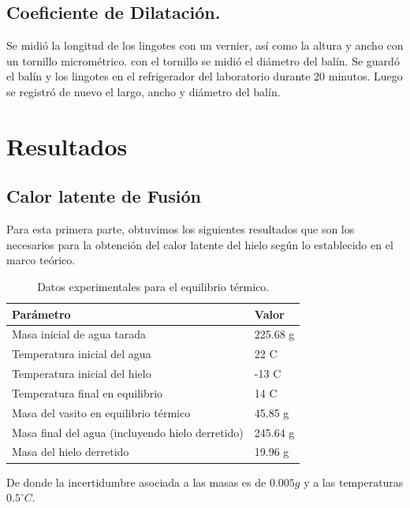 \documentclass{article}
\begin{document}
    \subsection{Coeficiente de Dilatación.}
        Se midió la longitud de los lingotes con un vernier, así como la altura y ancho con un tornillo micrométrico. con el tornillo se midió el diámetro del balín. Se guardó el balín y los lingotes en el refrigerador del laboratorio durante 20 minutos. Luego se registró de nuevo el largo, ancho y diámetro del balín.

\section{Resultados}
\subsection{Calor latente de Fusión}
Para esta primera parte, obtuvimos los siguientes resultados que son los necesarios para la obtención del calor latente del hielo según lo establecido en el marco teórico.

\begin{table}[h!]
\centering
\begin{tabular}{@{}ll@{}}
\toprule
\textbf{Parámetro}                             & \textbf{Valor}          \\ \midrule
Masa inicial de agua tarada                   & 225.68 g                \\
Temperatura inicial del agua                  & 22 \textdegree{}C       \\
Temperatura inicial del hielo                 & -13 \textdegree{}C      \\
Temperatura final en equilibrio               & 14 \textdegree{}C       \\
Masa del vasito en equilibrio térmico         & 45.85 g                 \\
Masa final del agua (incluyendo hielo derretido) & 245.64 g             \\
Masa del hielo derretido                      & 19.96 g                 \\ \bottomrule
\end{tabular}
\caption{Datos experimentales para el equilibrio térmico.}
\label{tab:equilibrio_termico}
\end{table}

De donde la incertidumbre asociada a las masas es de $0.005g$ y a las temperaturas $0.5^{\circ}C$.
\end{document}
